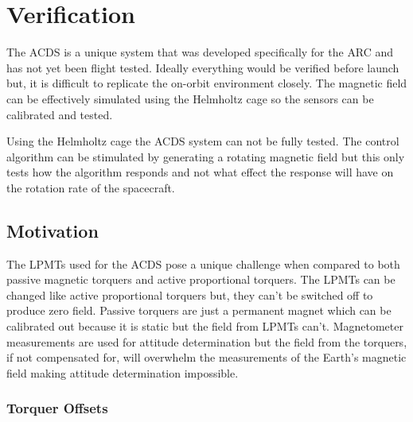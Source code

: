 
\chapter{Verification}

\label{ch:Verification}

The \ac{ACDS} is a unique system that was developed specifically for the \ac{ARC} and has not yet been flight tested. Ideally everything would be verified before launch but, it is difficult to replicate the on-orbit environment closely. The magnetic field can be effectively simulated using the Helmholtz cage so the sensors can be calibrated and tested. 

Using the Helmholtz cage the \ac{ACDS} system can not be fully tested. The control algorithm can be stimulated by generating a rotating magnetic field but this only tests how the algorithm responds and not what effect the response will have on the rotation rate of the spacecraft.

\section{Motivation}

The \acp{LPMT} used for the \ac{ACDS} pose a unique challenge when compared to both passive magnetic torquers and active proportional torquers. The \acp{LPMT} can be changed like active proportional torquers but, they can't be switched off to produce zero field. Passive torquers are just a permanent magnet which can be calibrated out because it is static but the field from \acp{LPMT} can't. Magnetometer measurements are used for attitude determination but the field from the torquers, if not compensated for, will overwhelm the measurements of the Earth's magnetic field making attitude determination impossible.

\subsection{Torquer Offsets}





